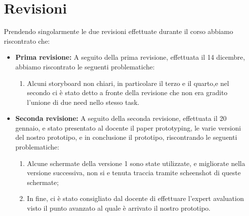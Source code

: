 \documentclass{article}
\begin{document}
\vspace{1cm}

\section{Revisioni}
Prendendo singolarmente le due revisioni effettuate durante il corso abbiamo riscontrato che:

\begin{minipage}{0,40\textwidth} 
\begin{itemize}

    \item \textbf{Prima revisione:} A seguito della prima revisione, effettuata il 14 dicembre, abbiamo riscontrato le seguenti problematiche:
    \begin{enumerate}
        \item Alcuni storyboard non chiari, in particolare il terzo e il quarto,e nel secondo ci è stato detto a fronte della revisione che non era gradito l'unione di due need nello stesso task.
    \end{enumerate}
\end{itemize}
\end{minipage}
\hspace{2cm}
\begin{minipage}{0.40\textwidth}
\begin{itemize}

    \item\textbf{Seconda revisione:} A seguito della seconda revisione, effettuata il 20 gennaio, e stato presentato al docente il paper prototyping, le varie versioni del nostro prototipo, e in conclusione il prototipo, riscontrando le seguenti problematiche:
    \begin{enumerate}
        \item Alcune schermate della versione 1 sono state utilizzate, e migliorate nella versione successiva, non si e tenuta traccia tramite scheenshot di queste schermate;
        \item In fine, ci è stato consigliato dal docente di effettuare l'expert avaluation visto il punto avanzato al quale è arrivato il nostro prototipo.

    \end{enumerate}
    
    \end{itemize}
\end{minipage} 
\end{document}
